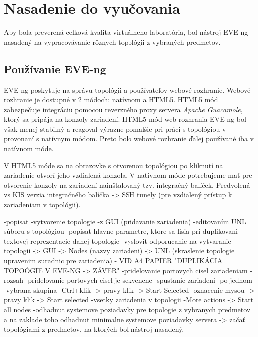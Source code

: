 \chapter{Nasadenie do vyučovania}
\label{chap:nasadenie_do_vyucovania}

Aby bola preverená celková kvalita virtuálneho laboratória, bol nástroj EVE-ng nasadený na vypracovávanie rôznych topológii z vybraných predmetov. 




\section{Používanie EVE-ng}
\label{chap:pouzivanie_eve_ng}

EVE-ng poskytuje na správu topológii a používateľov webové rozhranie. Webové rozhranie je dostupné v 2 módoch: natívnom a HTML5. HTML5 mód zabezpečuje integráciu pomocou reverzného proxy servera \emph{Apache Guacamole}, ktorý sa pripája na konzoly zariadení. HTML5 mód web rozhrania EVE-ng bol však menej stabilný a reagoval výrazne pomalšie pri práci s topológiou v provonaní s natívnym módom. Preto bolo webové rozhranie ďalej používané iba v natívnom móde.

V HTML5 móde sa na obrazovke s otvorenou topológiou po kliknutí na zariadenie otvorí jeho vzdialená konzola. V natívnom móde potrebujeme mať pre otvorenie konzoly na zariadení nainštalovaný tzv. integračný balíček. Predvolená vs KIS verzia integračného balíčka -> SSH tunely (pre vzdialený prístup k zariadeniam v topológii).



-popisat
      -vytvorenie topologie
        -z GUI (pridavanie zariadenia)
        -editovaním UNL súboru s topológiou
            -popisat hlavne parametre, ktore sa lisia pri duplikovani textovej reprezentacie danej topologie
        -vyslovit odporucanie na vytvaranie topologii
            -> GUI -> Nodes (nazvy zariadeni) -> UNL (skraslenie topologie upravenim suradnic pre zariadenia) - VID A4 PAPIER "DUPLIKÁCIA TOPOÓGIE V EVE-NG -> ZÁVER"
      -pridelovanie portovych cisel zariadeniam
        -rozsah
        -pridelovanie portovych cisel je sekvencne
      -spustanie zariadeni
        -po jednom
        -vybrana skupina
          -Ctrl+klik -> pravy klik -> Start Selected
          -oznacenie mysou -> pravy klik -> Start selected
        -vsetky zariadenia v topologii
          -More actions -> Start all nodes
      -odhadnut systemove poziadavky pre topologie z vybranych predmetov a na zaklade toho odhadnut minimalne systemove poziadavky servera
      -> začať topológiami z predmetov, na ktorých bol nástroj nasadený.




